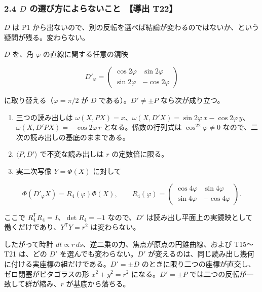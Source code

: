 \documentclass[
  a4paper,
]{ltjsarticle}
\providecommand{\tightlist}{%
  \setlength{\itemsep}{0pt}\setlength{\parskip}{0pt}}
\begin{document}
\subsubsection{\texorpdfstring{2.4 \(D\) の選び方によらないこと　【導出
T22】}{2.4 D の選び方によらないこと　【導出 T22】}}\label{d-ux306eux9078ux3073ux65b9ux306bux3088ux3089ux306aux3044ux3053ux3068-ux5c0eux51fa-t22}

\(D\) は P1
から出ないので、別の反転を選べば結論が変わるのではないか、という疑問が残る。変わらない。

\(D\) を、角 \(\varphi\) の直線に関する任意の鏡映

\[
D'_\varphi=\begin{pmatrix}\cos2\varphi&\sin2\varphi\\\sin2\varphi&-\cos2\varphi\end{pmatrix}
\]

に取り替える（\(\varphi=\pi/2\) が \(D\) である）。\(D'\neq\pm P\)
なら次が成り立つ。

\begin{enumerate}
\def\labelenumi{\arabic{enumi}.}
\tightlist
\item
  三つの読み出しは
  \(\omega(X,PX)=x\)、\(\omega(X,D'X)=\sin2\varphi\,x-\cos2\varphi\,y\)、\(\omega(X,D'PX)=-\cos2\varphi\,r\)
  となる。係数の行列式は \(\cos^22\varphi\neq0\)
  なので、二次の読み出しの基底のままである。
\item
  \(\langle P,D'\rangle\) で不変な読み出しは \(r\) の定数倍に限る。
\item
  実二次写像 \(Y=\Phi(X)\) に対して
\end{enumerate}

\[
\Phi(D'_\varphi X)=R_4(\varphi)\Phi(X),\qquad
R_4(\varphi)=
\begin{pmatrix}
\cos4\varphi&\sin4\varphi\\
\sin4\varphi&-\cos4\varphi
\end{pmatrix}.
\]

ここで \(R_4^{\mathsf T}R_4=I\)、\(\det R_4=-1\) なので、\(D'\)
は読み出し平面上の実鏡映として働くだけであり、\(Y^{\mathsf T}Y=r^2\)
は変わらない。

したがって時計
\(dt\propto r\,ds\)、逆二乗の力、焦点が原点の円錐曲線、および T15〜T21
は、どの \(D'\) を選んでも変わらない。\(D'\)
が変えるのは、同じ読み出し幾何に付ける実座標の組だけである。\(D'=\pm D\)
のときに限り二つの座標が直交し、ゼロ閉塞がピタゴラスの形 \(x^2+y^2=r^2\)
になる。\(D'=\pm P\) では二つの反転が一致して群が縮み、\(r\)
が基底から落ちる。
\end{document}
